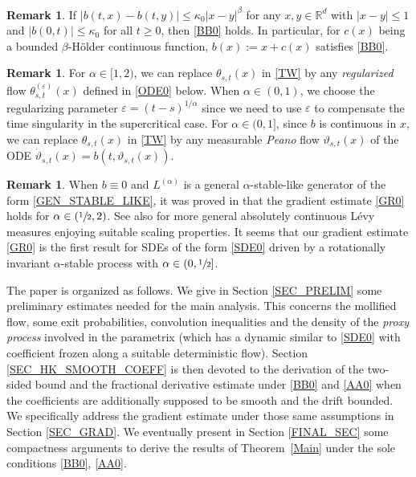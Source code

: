 \documentclass[11pt]{article}
\numberwithin{equation}{section}\providecommand{\asymp}{\mathrel{\sim}}
\theoremstyle{plain}
\theoremstyle{definition}
\newtheorem{remark}[theorem]{Remark}
\let\eps\varepsilon
\newcommand\mR{\mathbb{R}}
\newcommand\1{{\mathbf{1}}}
\begin{document}
\begin{remark}
If $|b(t,x)-b(t,y)|\leq\kappa_0|x-y|^\beta$ for any $x,y\in\mR^d$ with $|x-y|\leq 1$ and $|b(0,t)|\le \kappa_0 $ for all $t\ge 0 $, then
\eqref{BB0} holds. In particular, for $c(x)$ being a bounded $\beta$-Hölder continuous function, $b(x):=x+c(x)$ satisfies \eqref{BB0}.
\end{remark}

\begin{remark}
For $\alpha\in[1,2)$, we can replace $\theta_{s,t}(x)$ in \eqref{TW} by any {\it regularized} flow $\theta^{(\eps)}_{s,t}(x)$
defined in \eqref{ODE0} below. When $\alpha\in(0,1)$, we choose the regularizing parameter $\eps=(t-s)^{1/\alpha}$ since we need to use $\eps$ to compensate the
time singularity in the supercritical case.
For $\alpha\in(0,1]$, since $b$ is continuous in $x$, we can replace $\theta_{s,t}(x)$ in \eqref{TW} by any measurable {\it Peano} flow $\vartheta_{s,t}(x)$ of the ODE
$\dot\vartheta_{s,t}(x)=b(t,\vartheta_{s,t}(x))$.
\end{remark}

\begin{remark}
When $b\equiv 0$ and $L^{(\alpha)}$ is a general $\alpha$-stable-like {generator of the form \eqref{GEN_STABLE_LIKE}}, it was proved in \cite{Li-So-Xi}
that the gradient estimate \eqref{GR0} holds for $\alpha\in(\sfrac12,2)$. See also \cite{Ch-Zh20} for more general
{absolutely continuous Lévy measures enjoying suitable scaling properties.
}
It seems that our gradient estimate \eqref{GR0} is the first result for SDEs of the form \eqref{SDE0} driven by a rotationally invariant $\alpha$-stable process
with $\alpha\in(0,\sfrac12]$.
\end{remark}

The paper is organized as follows. We give in Section \ref{SEC_PRELIM} some preliminary estimates needed for the main analysis. This concerns the mollified flow, some exit probabilities, convolution inequalities and the density of the \textit{proxy process} involved in the parametrix (which has a dynamic similar to \eqref{SDE0} with coefficient frozen along a suitable deterministic flow).
Section \ref{SEC_HK_SMOOTH_COEFF} is then {devoted} to the derivation of the two-sided bound and the fractional derivative estimate under \eqref{BB0} and \eqref{AA0} when the coefficients are additionally supposed to be smooth and the drift bounded. We specifically address the gradient estimate under those same assumptions in Section \ref{SEC_GRAD}. We eventually present in Section \ref{FINAL_SEC} some compactness arguments to derive the results of Theorem~\ref{Main} under the sole conditions \eqref{BB0}, \eqref{AA0}.
\end{document}
